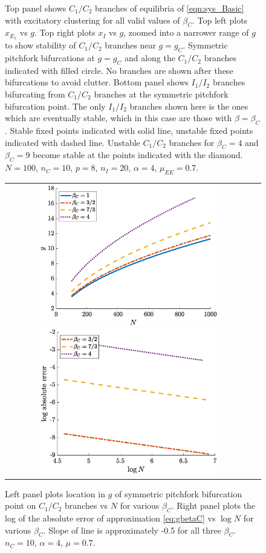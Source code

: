 \documentclass[reqno]{siamonline190516}
\begin{document}
\begin{figure}
    \caption{Top panel shows $C_1/C_2$ branches of equilibria of \cref{eqn:sys_Basic} with excitatory clustering for all valid values of $\beta_C$. Top left plots $x_{E_1}$ vs $g$. Top right plots $x_I$ vs $g$, zoomed into a narrower range of $g$ to show stability of $C_1/C_2$ branches near $g = g_C$. Symmetric pitchfork bifurcations at $g = g_C$ and along the $C_1/C_2$ branches indicated with filled circle. No branches are shown after these bifurcations to avoid clutter. Bottom panel shows $I_1/I_2$ branches bifurcating from $C_1/C_2$ branches at the symmetric pitchfork bifurcation point. The only $I_1/I_2$ branches shown here is the ones which are eventually stable, which in this case are those with $\beta = \beta_C$. Stable fixed points indicated with solid line, unstable fixed points indicated with dashed line. Unstable $C_1/C_2$ branches for $\beta_C = 4$ and $\beta_C = 9$ become stable at the points indicated with the diamond. $N = 100$, $n_C = 10$, $p = 8$, $n_I = 20$, $\alpha = 4$, $\mu_{EE} = 0.7$.}
    \label{fig:clusterBD2}
\end{figure}

\begin{figure}
    \centering
    \begin{tabular}{cc}
    \includegraphics[width=7.8cm]{images/clusterpitchgvsN.eps}
    \includegraphics[width=7.8cm]{images/clusterpitcherror.eps}
    \end{tabular}
    \caption{Left panel plots location in $g$ of symmetric pitchfork bifurcation point on $C_1/C_2$ branches vs $N$ for various $\beta_C$. Right panel plots the log of the absolute error of approximation \cref{eq:gbetaC} vs $\log N$ for various $\beta_C$. Slope of line is approximately -0.5 for all three $\beta_C$. $n_C = 10$, $\alpha = 4$, $\mu = 0.7$.}
    \label{fig:pitcherror}
\end{figure}
\end{document}
